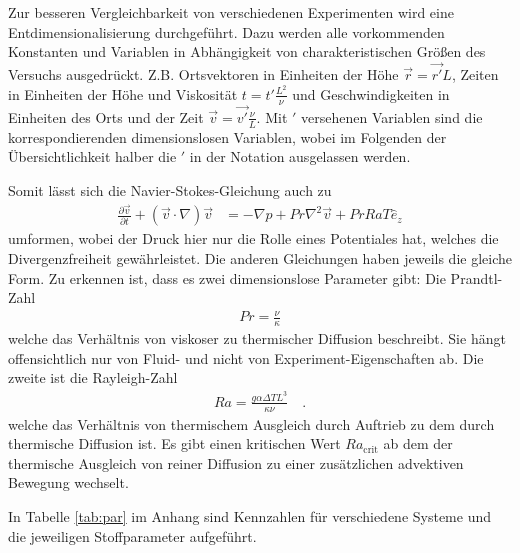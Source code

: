 \documentclass[12pt,a4paper,titlepage,headinclude]{scrartcl}
\numberwithin{equation}{subsection}
\begin{document}
Zur besseren Vergleichbarkeit von verschiedenen Experimenten wird eine Entdimensionalisierung durchgeführt.
Dazu werden alle vorkommenden Konstanten und Variablen in Abhängigkeit von charakteristischen Größen des Versuchs ausgedrückt.
Z.B. Ortsvektoren in Einheiten der Höhe $\vec{r}=\vec{r'} L$, Zeiten in Einheiten der Höhe und Viskosität $t=t' \frac{L^2}{\nu}$ und Geschwindigkeiten in Einheiten des Orts und der Zeit $\vec{v}=\vec{v'}\frac{\nu}{L}$.
Mit $'$ versehenen Variablen sind die korrespondierenden dimensionslosen Variablen, wobei im Folgenden der Übersichtlichkeit halber die $'$ in der Notation ausgelassen werden.

Somit lässt sich die Navier-Stokes-Gleichung auch zu
\begin{align}
	\frac{\partial \vec{v}}{\partial t}+\left( \vec{v}\cdot\nabla \right)\vec{v} &= -\nabla p + Pr\nabla^2\vec{v}+PrRaT\hat{e}_z
\end{align}
umformen, wobei der Druck hier nur die Rolle eines Potentiales hat, welches die Divergenzfreiheit gewährleistet.
Die anderen Gleichungen haben jeweils die gleiche Form.
Zu erkennen ist, dass es zwei dimensionslose Parameter gibt:
Die Prandtl-Zahl
\begin{align}
	Pr=\frac{\nu}{\kappa}\label{eq:Pr}
\end{align}
welche das Verhältnis von viskoser zu thermischer Diffusion beschreibt.
Sie hängt offensichtlich nur von Fluid- und nicht von Experiment-Eigenschaften ab.
Die zweite ist die Rayleigh-Zahl
\begin{align}
	Ra=\frac{g\alpha\Delta T L^3}{\kappa\nu}\quad.\label{eq:Ra}
\end{align}
welche das Verhältnis von thermischem Ausgleich durch Auftrieb zu dem durch thermische Diffusion ist.
Es gibt einen kritischen Wert $Ra_\text{crit}$ ab dem der thermische Ausgleich von reiner Diffusion zu einer zusätzlichen advektiven Bewegung wechselt.

In Tabelle \ref{tab:par} im Anhang sind Kennzahlen für verschiedene Systeme und die jeweiligen Stoffparameter aufgeführt.
\end{document}
